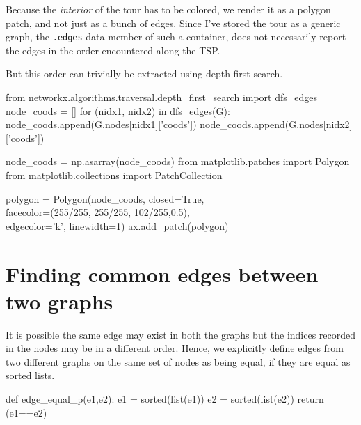 Because the \textit{interior} of the tour has to be colored, we render it as a polygon patch, and not
just as a bunch of edges. Since I've stored the tour as a generic graph, 
the \verb|.edges| data member of such a container, does not necessarily report 
the edges in the order encountered along the TSP. 

But this order can trivially be extracted using depth first search. 

\nwenddocs{}\endmoddef\nwstartdeflinemarkup{}\nwenddeflinemarkup
from networkx.algorithms.traversal.depth_first_search import dfs_edges
node_coods = []
for (nidx1, nidx2) in dfs_edges(G):
       node_coods.append(G.nodes[nidx1]['coods'])
       node_coods.append(G.nodes[nidx2]['coods'])

node_coods = np.asarray(node_coods)
from matplotlib.patches import Polygon
from matplotlib.collections import PatchCollection

polygon = Polygon(node_coods, closed=True, \\
                  facecolor=(255/255, 255/255, 102/255,0.5), \\
                  edgecolor='k', linewidth=1)
ax.add_patch(polygon)
\nwendcode{}\nwdocspar



\section{Finding common edges between two graphs}


It is possible the same edge may exist in both the graphs
but the indices recorded in the nodes may be in a different order. 
Hence, we explicitly define edges from two different graphs on the same set of nodes
as being equal, if they are equal as sorted lists.

\nwenddocs{}\endmoddef\nwstartdeflinemarkup{}\nwenddeflinemarkup
def edge_equal_p(e1,e2):
     e1 = sorted(list(e1))
     e2 = sorted(list(e2))
     return (e1==e2)
\nwendcode{}\nwdocspar

